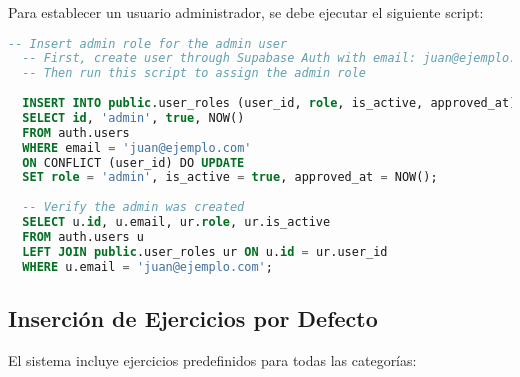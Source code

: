 \documentclass[12pt,a4paper]{article}
\begin{document}
Para establecer un usuario administrador, se debe ejecutar el siguiente script:

\begin{lstlisting}[language=SQL, caption=Script para crear usuario administrador]
  -- Insert admin role for the admin user
  -- First, create user through Supabase Auth with email: juan@ejemplo.com and password: 123456
  -- Then run this script to assign the admin role
  
  INSERT INTO public.user_roles (user_id, role, is_active, approved_at)
  SELECT id, 'admin', true, NOW()
  FROM auth.users
  WHERE email = 'juan@ejemplo.com'
  ON CONFLICT (user_id) DO UPDATE
  SET role = 'admin', is_active = true, approved_at = NOW();
  
  -- Verify the admin was created
  SELECT u.id, u.email, ur.role, ur.is_active
  FROM auth.users u
  LEFT JOIN public.user_roles ur ON u.id = ur.user_id
  WHERE u.email = 'juan@ejemplo.com';
\end{lstlisting}

\subsection{Inserción de Ejercicios por Defecto}

El sistema incluye ejercicios predefinidos para todas las categorías:
\end{document}
